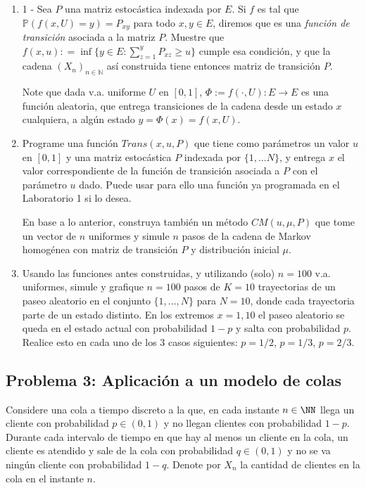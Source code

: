 \begin{enumerate}
	\item  1 - Sea $P$ una matriz estocástica  indexada por $E$. Si	$f$ es tal que $ \mathbb{P}(f(x,U)=y)= P_{xy} $ para todo $x,y\in E$, diremos que es una  \textit{función de transición} asociada a la matriz $P$. Muestre que $f(x,u): = \inf \{y\in E : \sum_{z=1}^y P_{xz}\geq u\}$ cumple esa condición, y que   la cadena $(X_n)_{n\in\mathbb{N}}$  así  construida tiene entonces matriz de transición $P$.

    Note que dada  v.a. uniforme $U$ en $[0,1]$, $\Phi:= f(\cdot,  U):E \rightarrow E$  es una función aleatoria,  que entrega transiciones de la cadena desde  un estado $x$ cualquiera, a algún estado $y=\Phi(x)= f(x,  U)$.  
				
	\item  Programe una función $Trans(x,u,P)$ que tiene  como parámetros un valor $u$  en $[0,1]$ y una matriz estocástica $P$ indexada por $\{1,...N\}$, y  entrega  $x$ el  valor correspondiente de la función de transición  asociada a $P$ con el parámetro $u$ dado.  Puede usar para ello una función ya programada en el Laboratorio 1 si lo desea.

    En base a lo anterior, construya  también  un método $CM(u,\mu,P)$ que tome un vector de $n$ uniformes y simule $n$ pasos de la cadena de Markov homogénea con matriz de transición $P$ y distribución inicial $\mu$. 

	\item Usando las funciones antes construidas, y utilizando (solo)  $n=100$ v.a. uniformes,   simule y grafique $n=100$ pasos de  $K=10$ trayectorias de un paseo aleatorio en el conjunto $\{1,...,N\}$ para $N=10$, donde cada trayectoria parte de  un estado distinto. En los extremos $x=1,10$ el paseo aleatorio se queda en el estado actual con probabilidad $1-p$ y salta con probabilidad $p$.  Realice esto  en cada uno de  los 3 casos siguientes: 	 $p=1/2$, $p=1/3$, $p= 2/3$.
\end{enumerate}

\subsection*{Problema 3: Aplicación a un modelo de colas}

Considere una cola a tiempo discreto a la que, en cada instante $n\in \NN$ llega un cliente con probabilidad $p\in (0,1)$ y no llegan clientes con probabilidad $1-p$. Durante cada intervalo de tiempo en que hay al menos un cliente en la cola, un cliente es atendido y sale de la cola con probabilidad $q\in (0,1)$ y no se va ningún cliente con probabilidad $1-q$. Denote por $X_n$ la cantidad de clientes en la cola en el instante $n$.

